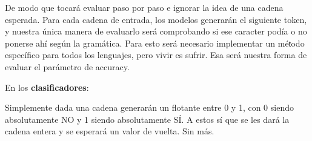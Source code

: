 De modo que tocará evaluar paso por paso e ignorar la idea de una cadena esperada. Para cada cadena de entrada, los modelos generarán el siguiente
token, y nuestra única manera de evaluarlo será comprobando si ese caracter podía o no ponerse ahí según la gramática. Para esto será necesario
implementar un méŧodo específico para todos los lenguajes, pero vivir es sufrir. Esa será nuestra forma de evaluar el parámetro de accuracy.

En los \textbf{clasificadores}:

Simplemente dada una cadena generarán un flotante entre 0 y 1, con 0 siendo absolutamente NO y 1 siendo absolutamente SÍ. A estos sí que se les 
dará la cadena entera y se esperará un valor de vuelta. Sin más.


